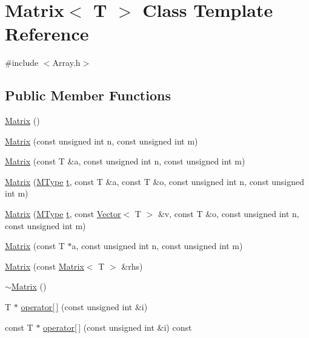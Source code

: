\hypertarget{classMatrix}{}\section{Matrix$<$ T $>$ Class Template Reference}
\label{classMatrix}


{\ttfamily \#include $<$Array.\+h$>$}

\subsection*{Public Member Functions}
\begin{DoxyCompactItemize}
\item 
\mbox{\hyperlink{classMatrix_a9d567e3a121b1be0c3f9c461cab524fe}{Matrix}} ()
\item 
\mbox{\hyperlink{classMatrix_ac8061527f81abb94e19b1ac6fd4af63a}{Matrix}} (const unsigned int n, const unsigned int m)
\item 
\mbox{\hyperlink{classMatrix_a697e01f8d46c2059d0420d5b420efb91}{Matrix}} (const T \&a, const unsigned int n, const unsigned int m)
\item 
\mbox{\hyperlink{classMatrix_a991881e660607b10ff4fbf705006108d}{Matrix}} (\mbox{\hyperlink{Array_8h_afb4b79601b9f07458ff37d2c507b3e6d}{M\+Type}} \mbox{\hyperlink{Array_8h_a182b5b431d17bd072b8384e4ad728cf3}{t}}, const T \&a, const T \&o, const unsigned int n, const unsigned int m)
\item 
\mbox{\hyperlink{classMatrix_ab2f0cdfc1e7aac9ddd46a1c6b6a3f2f9}{Matrix}} (\mbox{\hyperlink{Array_8h_afb4b79601b9f07458ff37d2c507b3e6d}{M\+Type}} \mbox{\hyperlink{Array_8h_a182b5b431d17bd072b8384e4ad728cf3}{t}}, const \mbox{\hyperlink{classVector}{Vector}}$<$ T $>$ \&v, const T \&o, const unsigned int n, const unsigned int m)
\item 
\mbox{\hyperlink{classMatrix_a33a507863c86bbc82e650054f1cc13b6}{Matrix}} (const T $\ast$a, const unsigned int n, const unsigned int m)
\item 
\mbox{\hyperlink{classMatrix_a6a46705243036bfeee78fe2c84c54340}{Matrix}} (const \mbox{\hyperlink{classMatrix}{Matrix}}$<$ T $>$ \&rhs)
\item 
\mbox{\hyperlink{classMatrix_a91aa704de674203e96aece9e1955ccd3}{$\sim$\+Matrix}} ()
\item 
T $\ast$ \mbox{\hyperlink{classMatrix_a771eff354da6c0008228dc19cde4142a}{operator\mbox{[}$\,$\mbox{]}}} (const unsigned int \&i)
\item 
const T $\ast$ \mbox{\hyperlink{classMatrix_af58cf6372d17f7abf5396d32f3ef5cd7}{operator\mbox{[}$\,$\mbox{]}}} (const unsigned int \&i) const

\end{DoxyCompactItemize}
